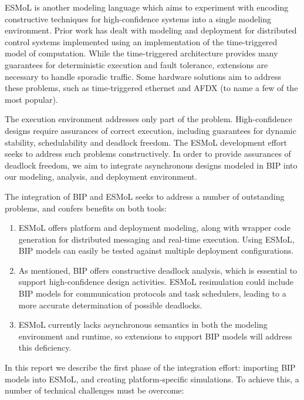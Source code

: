ESMoL is another modeling language which aims to experiment with encoding constructive 
techniques for high-confidence systems into a single modeling environment.  Prior work has 
dealt with modeling and deployment for distributed control systems implemented using an 
implementation of the time-triggered model of computation\cite{timed:frodo, modeling:aces08, sched:analysis}.  
While the time-triggered architecture \cite{timed:tta2} provides many guarantees for
deterministic execution and fault tolerance, extensions are necessary to handle 
sporadic traffic.  Some hardware solutions aim to address these problems, such as 
time-triggered ethernet\cite{timed:ttethernet} and AFDX\cite{afdxspec} (to name a few of 
the most popular).

The execution environment addresses only part of the problem.  High-confidence designs
require assurances of correct execution, including guarantees for dynamic stability, 
schedulability and deadlock freedom.  The ESMoL development effort seeks to address such problems 
constructively.  In order to provide assurances of deadlock freedom, we aim to integrate 
asynchronous designs modeled in BIP into our modeling, analysis, and deployment environment.

The integration of BIP and ESMoL seeks to address a number of outstanding problems, and
confers benefits on both tools:

\begin{enumerate}
 \item ESMoL offers platform and deployment modeling, along with wrapper code generation
for distributed messaging and real-time execution.  Using ESMoL, BIP models can easily be 
tested against multiple deployment configurations.
 \item As mentioned, BIP offers constructive deadlock analysis, which is essential to 
support high-confidence design activities.  ESMoL resimulation could include BIP models 
for communication protocols and task schedulers, leading to a more accurate determination
of possible deadlocks.
 \item ESMoL currently lacks asynchronous semantics in both the modeling environment and
runtime, so extensions to support BIP models will address this deficiency.
\end{enumerate}

In this report we describe the first phase of the integration effort: importing BIP models
into ESMoL, and creating platform-specific simulations.  To achieve this, a number of 
technical challenges must be overcome:

